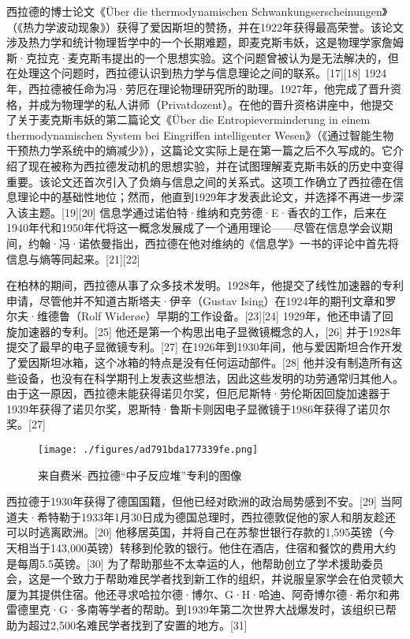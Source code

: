 西拉德的博士论文《Über die thermodynamischen Schwankungserscheinungen》（《热力学波动现象》）获得了爱因斯坦的赞扬，并在1922年获得最高荣誉。该论文涉及热力学和统计物理哲学中的一个长期难题，即麦克斯韦妖，这是物理学家詹姆斯·克拉克·麦克斯韦提出的一个思想实验。这个问题曾被认为是无法解决的，但在处理这个问题时，西拉德认识到热力学与信息理论之间的联系。[17][18] 1924年，西拉德被任命为冯·劳厄在理论物理研究所的助理。1927年，他完成了晋升资格，并成为物理学的私人讲师（Privatdozent）。在他的晋升资格讲座中，他提交了关于麦克斯韦妖的第二篇论文《Über die Entropieverminderung in einem thermodynamischen System bei Eingriffen intelligenter Wesen》（《通过智能生物干预热力学系统中的熵减少》），这篇论文实际上是在第一篇之后不久写成的。它介绍了现在被称为西拉德发动机的思想实验，并在试图理解麦克斯韦妖的历史中变得重要。该论文还首次引入了负熵与信息之间的关系式。这项工作确立了西拉德在信息理论中的基础性地位；然而，他直到1929年才发表此论文，并选择不再进一步深入该主题。[19][20] 信息学通过诺伯特·维纳和克劳德·E·香农的工作，后来在1940年代和1950年代将这一概念发展成了一个通用理论——尽管在信息学会议期间，约翰·冯·诺依曼指出，西拉德在他对维纳的《信息学》一书的评论中首先将信息与熵等同起来。[21][22]

在柏林的期间，西拉德从事了众多技术发明。1928年，他提交了线性加速器的专利申请，尽管他并不知道古斯塔夫·伊辛（Gustav Ising）在1924年的期刊文章和罗尔夫·维德鲁（Rolf Widerøe）早期的工作设备。[23][24] 1929年，他还申请了回旋加速器的专利。[25] 他还是第一个构思出电子显微镜概念的人，[26] 并于1928年提交了最早的电子显微镜专利。[27] 在1926年到1930年间，他与爱因斯坦合作开发了爱因斯坦冰箱，这个冰箱的特点是没有任何运动部件。[28] 他并没有制造所有这些设备，也没有在科学期刊上发表这些想法，因此这些发明的功劳通常归其他人。由于这一原因，西拉德未能获得诺贝尔奖，但厄尼斯特·劳伦斯因回旋加速器于1939年获得了诺贝尔奖，恩斯特·鲁斯卡则因电子显微镜于1986年获得了诺贝尔奖。[27]
\begin{figure}[ht]
\centering
\texttt{[image: ./figures/ad791bda177339fe.png]}
\caption{来自费米–西拉德“中子反应堆”专利的图像} \label{fig_Szilar_3}
\end{figure}
西拉德于1930年获得了德国国籍，但他已经对欧洲的政治局势感到不安。[29] 当阿道夫·希特勒于1933年1月30日成为德国总理时，西拉德敦促他的家人和朋友趁还可以时逃离欧洲。[20] 他移居英国，并将自己在苏黎世银行存款的1,595英镑（今天相当于143,000英镑）转移到伦敦的银行。他住在酒店，住宿和餐饮的费用大约是每周5.5英镑。[30] 为了帮助那些不太幸运的人，他帮助创立了学术援助委员会，这是一个致力于帮助难民学者找到新工作的组织，并说服皇家学会在伯灵顿大厦为其提供住宿。他还寻求哈拉尔德·博尔、G·H·哈迪、阿奇博尔德·希尔和弗雷德里克·G·多南等学者的帮助。到1939年第二次世界大战爆发时，该组织已帮助为超过2,500名难民学者找到了安置的地方。[31]
